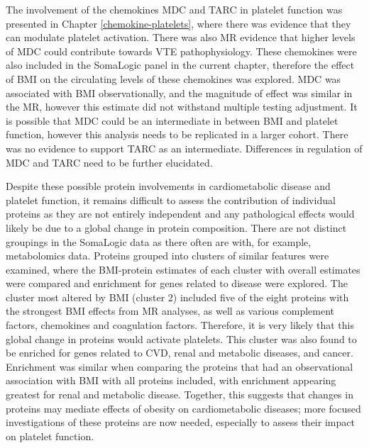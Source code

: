 \documentclass[11pt,twoside]{bristolthesis}
\begin{document}
The involvement of the chemokines MDC and TARC in platelet function was presented in Chapter \ref{chemokine-platelets}, where there was evidence that they can modulate platelet activation. There was also MR evidence that higher levels of MDC could contribute towards VTE pathophysiology. These chemokines were also included in the SomaLogic panel in the current chapter, therefore the effect of BMI on the circulating levels of these chemokines was explored. MDC was associated with BMI observationally, and the magnitude of effect was similar in the MR, however this estimate did not withstand multiple testing adjustment. It is possible that MDC could be an intermediate in between BMI and platelet function, however this analysis needs to be replicated in a larger cohort. There was no evidence to support TARC as an intermediate. Differences in regulation of MDC and TARC need to be further elucidated.

Despite these possible protein involvements in cardiometabolic disease and platelet function, it remains difficult to assess the contribution of individual proteins as they are not entirely independent and any pathological effects would likely be due to a global change in protein composition. There are not distinct groupings in the SomaLogic data as there often are with, for example, metabolomics data. Proteins grouped into clusters of similar features were examined, where the BMI-protein estimates of each cluster with overall estimates were compared and enrichment for genes related to disease were explored. The cluster most altered by BMI (cluster 2) included five of the eight proteins with the strongest BMI effects from MR analyses, as well as various complement factors, chemokines and coagulation factors. Therefore, it is very likely that this global change in proteins would activate platelets. This cluster was also found to be enriched for genes related to CVD, renal and metabolic diseases, and cancer. Enrichment was similar when comparing the proteins that had an observational association with BMI with all proteins included, with enrichment appearing greatest for renal and metabolic disease. Together, this suggests that changes in proteins may mediate effects of obesity on cardiometabolic diseases; more focused investigations of these proteins are now needed, especially to assess their impact on platelet function.
\end{document}
